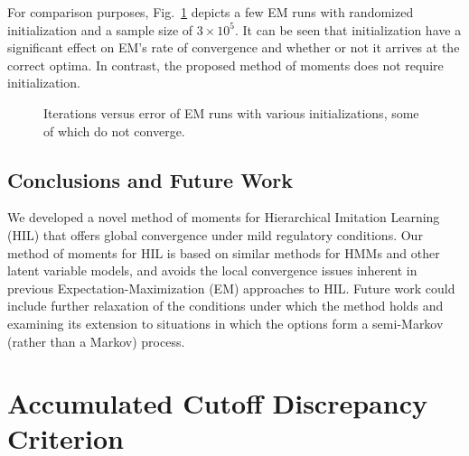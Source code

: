 For comparison purposes, Fig.\ \ref{fig:EM_error} depicts a few EM runs with randomized initialization and a sample size of $3 \times 10^5$. It can be seen that initialization have a significant effect on EM's rate of convergence and whether or not it arrives at the correct optima. In contrast, the proposed method of moments does not require initialization.
\begin{figure}
    \centering
    \caption{Iterations versus error of EM runs with various initializations, some of which do not converge.}
    \label{fig:EM_error}
\end{figure}

\section{Conclusions and Future Work}
\label{sec:conclusions}
We developed a novel method of moments for Hierarchical Imitation Learning (HIL) that offers global convergence under mild regulatory conditions.
Our method of moments for HIL is based on similar methods for HMMs and other latent variable models, and avoids the local convergence issues inherent in previous Expectation-Maximization (EM) approaches to HIL.
Future work could include further relaxation of the conditions under which the method holds and examining its extension to situations in which the options form a semi-Markov (rather than a Markov) process.

\chapter{Accumulated Cutoff Discrepancy Criterion}\label{chap:ACDC}

